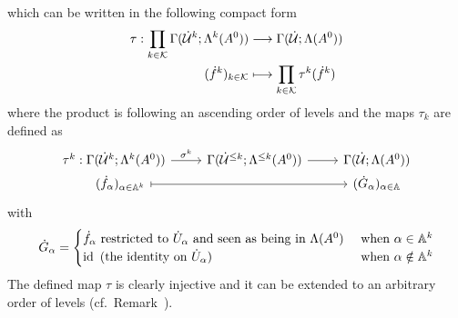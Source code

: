 \begin{prop}
  which can be written in the following compact form
  \begin{align*}
    \tau:\prod_{k\in\mathcal{K}}\Gamma(\dot {\mathcal{U}}^k;\Lambda^k(A^0))
    &\longrightarrow
    \Gamma(\dot{\mathcal{U}};\Lambda(A^0))
  \\(\dot f^k)_{k\in\mathcal{K}}
    &\longmapsto
    \prod_{k\in\mathcal{K}}\tau^k(\dot f^k)
  \end{align*}
  where the product is following an ascending order of levels and the maps
  $\tau_k$ are defined as
  \[ \begin{tikzcd}[row sep=0cm]
    \tau^k:\Gamma(\dot\cU^k;\Lambda^k(A^0))
    \arrow{r}{\sigma^k}&
    \Gamma(\dot\cU^{\leq k};\Lambda^{\leq k}(A^0))
    \rar &
    \Gamma(\dot\cU;\Lambda(A^0))
  \\~~~(\dot f_\alpha)_{\alpha\in\A^k}
    \arrow[|->]{rr}
    &&
    (\dot G_\alpha)_{\alpha\in\A}
  \end{tikzcd} \]
  with
  \[
    \dot G_\alpha=\begin{cases}
      \dot f_\alpha \text{~restricted to } \dot U_\alpha
      \text{~and seen as being in } \Lambda(A^0)
      & \text{~when } \alpha\in\mathbb{A}^k
    \\\operatorname{id} \text{~(the identity on $\dot U_\alpha$) }
      & \text{~when } \alpha\notin\mathbb{A}^k
    \end{cases}
  \]
  The defined map $\tau$ is clearly injective and it can be extended to an
  arbitrary order of levels (cf.\ Remark~\cite[Rem.II.3.5]{Loday1994}).
\end{prop}
